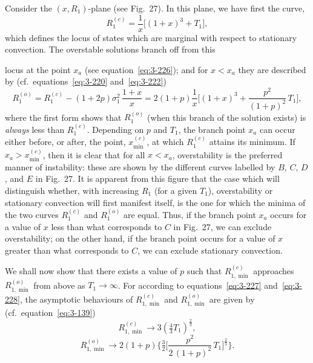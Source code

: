 Consider the $(x, R_1)$-plane (see Fig.~27). In this plane, we have first the curve,
\begin{equation}\label{eq:3-227}
R_1^{(c)} = \frac{1}{x}\big[(1+x)^3 + T_1\big],
\end{equation}
which defines the locus of states which are marginal with respect to stationary convection. The overstable solutions branch off from this


\noindent locus at the point $x_a$ (see equation~\eqref{eq:3-226}); and for $x < x_a$ they are described by (cf.\ equations~\eqref{eq:3-220} and~\eqref{eq:3-222})
\begin{equation}\label{eq:3-228}
R_1^{(o)} = R_1^{(c)} - (1+2p)\sigma_1^2\,\frac{1+x}{x} = 2(1+p)\frac{1}{x}\bigg[(1+x)^3 + \frac{p^2}{(1+p)^2}\,T_1\bigg],
\end{equation}
where the first form shows that $R_1^{(o)}$ (when this branch of the solution exists) is \emph{always} less than $R_1^{(c)}$. Depending on $p$ and $T_1$, the branch point $x_a$ can occur either before, or after, the point, $x_{\min}^{(c)}$, at which $R_1^{(c)}$ attains its minimum. If $x_a > x_{\min}^{(c)}$, then it is clear that for all $x < x_a$, overstability is the preferred manner of instability: these are shown by the different curves labelled by $B$, $C$, $D$, and $E$ in Fig.~27. It is apparent from this figure that the case which will distinguish whether, with increasing $R_1$ (for a given $T_1$), overstability or stationary convection will first manifest itself, is the one for which the minima of the two curves $R_1^{(c)}$ and $R_1^{(o)}$ are equal. Thus, if the branch point $x_a$ occurs for a value of $x$ less than what corresponds to $C$ in Fig.~27, we can exclude overstability; on the other hand, if the branch point occurs for a value of $x$ greater than what corresponds to $C$, we can exclude stationary convection.

We shall now show that there exists a value of $p$ such that $R_{1,\min}^{(c)}$ approaches $R_{1,\min}^{(o)}$ from above as $T_1 \to \infty$. For according to equations~\eqref{eq:3-227} and~\eqref{eq:3-228}, the asymptotic behaviours of $R_{1,\min}^{(c)}$ and $R_{1,\min}^{(o)}$ are given by (cf.\ equation~\eqref{eq:3-139})
\begin{equation}\label{eq:3-229}
R_{1,\min}^{(c)} \to 3(\tfrac{4}{3}T_1)^{\frac{2}{3}},
\end{equation}
\begin{equation}\label{eq:3-230}
R_{1,\min}^{(o)} \to 2(1+p)\bigg\{\tfrac{3}{2}\bigg[\frac{p^2}{2\,(1+p)^2}\,T_1\bigg]^{\frac{2}{3}}\bigg\}.
\end{equation}

